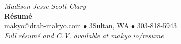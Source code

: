 
\begin{center}
  {\huge \textit{\color{titlegreydark} Madison Jesse Scott-Clary}}\\
  {\Huge{\textbf{R\'esum\'e}}}\\
  {\color{titlegreydark} makyo@drab-makyo.com $\bullet$ 3Sultan, WA $\bullet$ 303-818-5943}\\
  {\small \color{titlegreylight} \textit{Full r\'esum\'e and C.V. available at makyo.io/resume}}
\end{center}
